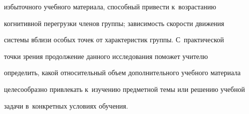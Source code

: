 избыточного учебного материала, способный привести к~возрастанию 


когнитивной перегрузки членов группы; за\-ви\-си\-мость ско\-рости движения  


сис\-те\-мы вблизи особых точек от характеристик группы. С~прак\-ти\-че\-ской 


точки зрения продолжение данного исследования поможет учителю 


определить, какой относительный объем дополнительного учебного материала 


целесообразно привлекать к~изучению пред\-мет\-ной темы или решению учебной 


задачи в~конкретных условиях обуче\-ния.


{





}


  



